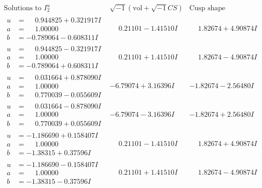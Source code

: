 \documentclass[1p]{elsarticle_modified}
\theoremstyle{definition}
\newcommand{\I}{\sqrt{-1}}
\begin{document}
$$\begin{array}{c|c|c}  
\text{Solutions to }I^u_{2}& \I (\text{vol} + \sqrt{-1}CS) & \text{Cusp shape}\\
 \hline 
\begin{aligned}
u &= \phantom{-}0.944825 + 0.321917 I \\
a &= \phantom{-}1.00000\phantom{ +0.000000I} \\
b &= -0.789064 - 0.608311 I\end{aligned}
 & \phantom{-}0.21101 - 1.41510 I & \phantom{-}1.82674 + 4.90874 I \\ \hline\begin{aligned}
u &= \phantom{-}0.944825 - 0.321917 I \\
a &= \phantom{-}1.00000\phantom{ +0.000000I} \\
b &= -0.789064 + 0.608311 I\end{aligned}
 & \phantom{-}0.21101 + 1.41510 I & \phantom{-}1.82674 - 4.90874 I \\ \hline\begin{aligned}
u &= \phantom{-}0.031664 + 0.878090 I \\
a &= \phantom{-}1.00000\phantom{ +0.000000I} \\
b &= \phantom{-}0.770039 - 0.055609 I\end{aligned}
 & -6.79074 + 3.16396 I & -1.82674 - 2.56480 I \\ \hline\begin{aligned}
u &= \phantom{-}0.031664 - 0.878090 I \\
a &= \phantom{-}1.00000\phantom{ +0.000000I} \\
b &= \phantom{-}0.770039 + 0.055609 I\end{aligned}
 & -6.79074 - 3.16396 I & -1.82674 + 2.56480 I \\ \hline\begin{aligned}
u &= -1.186690 + 0.158407 I \\
a &= \phantom{-}1.00000\phantom{ +0.000000I} \\
b &= -1.38315 + 0.37596 I\end{aligned}
 & \phantom{-}0.21101 - 1.41510 I & \phantom{-}1.82674 + 4.90874 I \\ \hline\begin{aligned}
u &= -1.186690 - 0.158407 I \\
a &= \phantom{-}1.00000\phantom{ +0.000000I} \\
b &= -1.38315 - 0.37596 I\end{aligned}
 & \phantom{-}0.21101 + 1.41510 I & \phantom{-}1.82674 - 4.90874 I \\ \hline\begin{aligned}

\end{aligned}
\end{array}$$
\end{document}
